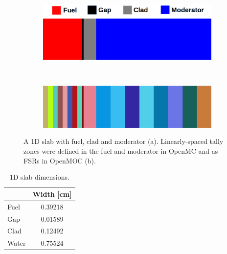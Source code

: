 \begin{figure}[h!]
\begin{subfigure}{\textwidth}
  \centering
  \includegraphics[width=0.7\linewidth]{figures/biases/slab/slab-simple-labels}
  \caption{}
\end{subfigure} \\
\begin{subfigure}{\textwidth}
  \centering
  \includegraphics[width=0.7\linewidth]{figures/biases/slab/slab-8x}
  \caption{}
\end{subfigure}
\caption[1D slab materials and geometry]{A 1D slab with fuel, clad and moderator (a). Linearly-spaced tally zones were defined in the fuel and moderator in OpenMC and as \ac{FSR}s in OpenMOC (b).}
\label{fig:chap4-slab}
\end{figure}

\begin{table}[h!]
  \centering
  \caption[1D slab dimensions]{1D slab dimensions.}
  \small
  \label{table:chap4-slab-widths} 
  \vspace{6pt}
  \begin{tabular}{b c}
  \toprule
  \rowcolor{lightgray}
  \multicolumn{1}{c}{\bf Material} &
  \multicolumn{1}{c}{\bf Width [cm]} \\
  \midrule
  Fuel &  0.39218 \\
  Gap &   0.01589 \\
  Clad &  0.12492 \\
  Water & 0.75524 \\
  \bottomrule
\end{tabular}
\end{table}

